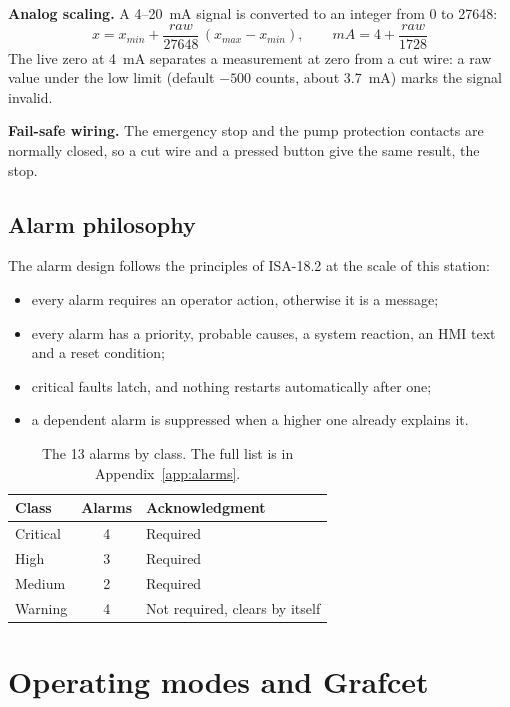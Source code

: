 \documentclass[11pt,a4paper]{report}
\begin{document}
	\textbf{Analog scaling.} A 4--20~mA signal is converted to an integer from 0 to 27648:
	\begin{equation}
		x = x_{min}+\frac{raw}{27648}\,(x_{max}-x_{min}),\qquad mA = 4+\frac{raw}{1728}
	\end{equation}
	The live zero at 4~mA separates a measurement at zero from a cut wire: a raw value under the low limit (default $-500$ counts, about 3.7~mA) marks the signal invalid.
	
	\textbf{Fail-safe wiring.} The emergency stop and the pump protection contacts are normally closed, so a cut wire and a pressed button give the same result, the stop.
	
	\section{Alarm philosophy}
	
	The alarm design follows the principles of ISA-18.2 at the scale of this station:
	\begin{itemize}
		\item every alarm requires an operator action, otherwise it is a message;
		\item every alarm has a priority, probable causes, a system reaction, an HMI text and a reset condition;
		\item critical faults latch, and nothing restarts automatically after one;
		\item a dependent alarm is suppressed when a higher one already explains it.
	\end{itemize}
	
	\begin{table}[H]\centering\small
		\begin{tabularx}{\linewidth}{|l|c|Y|}
			\hline
			Class & Alarms & Acknowledgment \\
			\hline
			Critical & 4 & Required \\
			High & 3 & Required \\
			Medium & 2 & Required \\
			Warning & 4 & Not required, clears by itself \\
			\hline
		\end{tabularx}
		\caption{The 13 alarms by class. The full list is in Appendix~\ref{app:alarms}.}\label{tab:alarmclass}
	\end{table}
	
	\chapter{Operating modes and Grafcet}\label{ch:modes}
	
\end{document}
